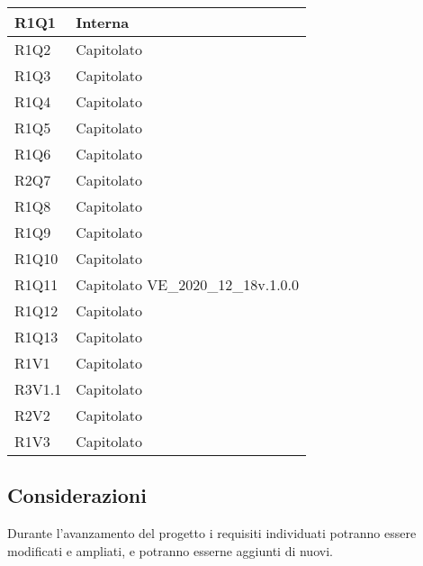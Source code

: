 \begin{center}
\begin{longtable}{|p{22mm}|p{44mm}|}
 R1Q1 &
Interna \newline
\\
\hline

R1Q2 &
Capitolato \newline
\\
\hline

R1Q3 &
Capitolato \newline
\\
\hline

R1Q4 &
Capitolato \newline
\\
\hline

R1Q5 &
Capitolato \newline
\\
\hline

R1Q6 &
Capitolato \newline
\\
\hline

R2Q7 &
Capitolato \newline
\\
\hline

R1Q8 &
Capitolato \newline
\\
\hline

R1Q9 &
Capitolato \newline
\\
\hline

R1Q10 &
Capitolato \newline
\\
\hline

R1Q11 &
Capitolato \newline
VE\_2020\_12\_18v.1.0.0 \newline
\\
\hline

R1Q12 &
Capitolato \newline
\\
\hline

R1Q13 &
Capitolato \newline
\\
\hline

 R1V1 &
Capitolato \newline
\\
\hline

R3V1.1 &
Capitolato \newline
\\
\hline

R2V2 &
Capitolato \newline
\\
\hline

R1V3 &
Capitolato \newline
\\
\hline

	
	\end{longtable}
\end{center}

\subsection{Considerazioni}
Durante l'avanzamento del progetto i requisiti individuati potranno essere modificati e ampliati, e potranno esserne aggiunti di nuovi.